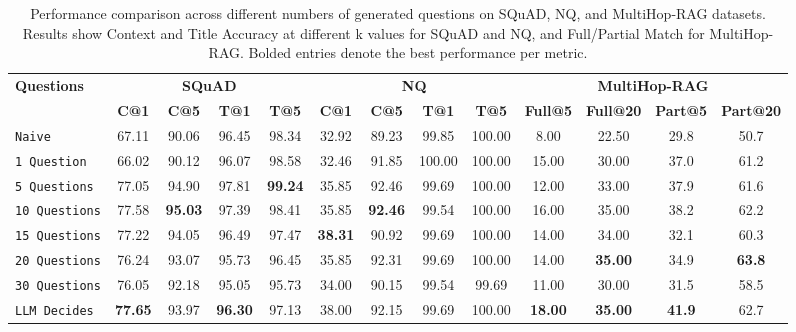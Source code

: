 \begin{table*}[t]
\centering
\caption{Performance comparison across different numbers of generated questions on SQuAD, NQ, and MultiHop-RAG datasets. Results show Context and Title Accuracy at different k values for SQuAD and NQ, and Full/Partial Match for MultiHop-RAG. Bolded entries denote the best performance per metric.}
\label{tab:questions-comparison}
\renewcommand{\arraystretch}{1.05}
\begin{tabular}{l|cccc|cccc|cccc}
\toprule
\multirow{2}{*}{\textbf{Questions}} 
& \multicolumn{4}{c|}{\textbf{SQuAD}} 
& \multicolumn{4}{c|}{\textbf{NQ}} 
& \multicolumn{4}{c}{\textbf{MultiHop-RAG}} \\
\cmidrule(lr){2-5}\cmidrule(lr){6-9}\cmidrule(lr){10-13}
& \textbf{C@1} & \textbf{C@5} & \textbf{T@1} & \textbf{T@5}
& \textbf{C@1} & \textbf{C@5} & \textbf{T@1} & \textbf{T@5}
& \textbf{Full@5} & \textbf{Full@20} & \textbf{Part@5} & \textbf{Part@20} \\
\midrule
\texttt{Naive}
& 67.11 & 90.06 & 96.45 & 98.34
& 32.92 & 89.23 & 99.85 & 100.00
& 8.00 & 22.50 & 29.8 & 50.7 \\
\midrule
\texttt{1 Question}
& 66.02 & 90.12 & 96.07 & 98.58
& 32.46 & 91.85 & 100.00 & 100.00
& 15.00 & 30.00 & 37.0 & 61.2 \\
\texttt{5 Questions}
& 77.05 & 94.90 & 97.81 & \textbf{99.24}
& 35.85 & 92.46 & 99.69 & 100.00
& 12.00 & 33.00 & 37.9 & 61.6 \\
\texttt{10 Questions}
& 77.58 & \textbf{95.03} & 97.39 & 98.41
& 35.85 & \textbf{92.46} & 99.54 & 100.00
& 16.00 & 35.00 & 38.2 & 62.2 \\
\texttt{15 Questions}
& 77.22 & 94.05 & 96.49 & 97.47
& \textbf{38.31} & 90.92 & 99.69 & 100.00
& 14.00 & 34.00 & 32.1 & 60.3 \\
\texttt{20 Questions}
& 76.24 & 93.07 & 95.73 & 96.45
& 35.85 & 92.31 & 99.69 & 100.00
& 14.00 & \textbf{35.00} & 34.9 & \textbf{63.8} \\
\texttt{30 Questions}
& 76.05 & 92.18 & 95.05 & 95.73
& 34.00 & 90.15 & 99.54 & 99.69
& 11.00 & 30.00 & 31.5 & 58.5 \\
\midrule
\texttt{LLM Decides}
& \textbf{77.65} & 93.97 & \textbf{96.30} & 97.13
& 38.00 & 92.15 & 99.69 & 100.00
& \textbf{18.00} & \textbf{35.00} & \textbf{41.9} & 62.7 \\
\bottomrule
\end{tabular}
\end{table*}



